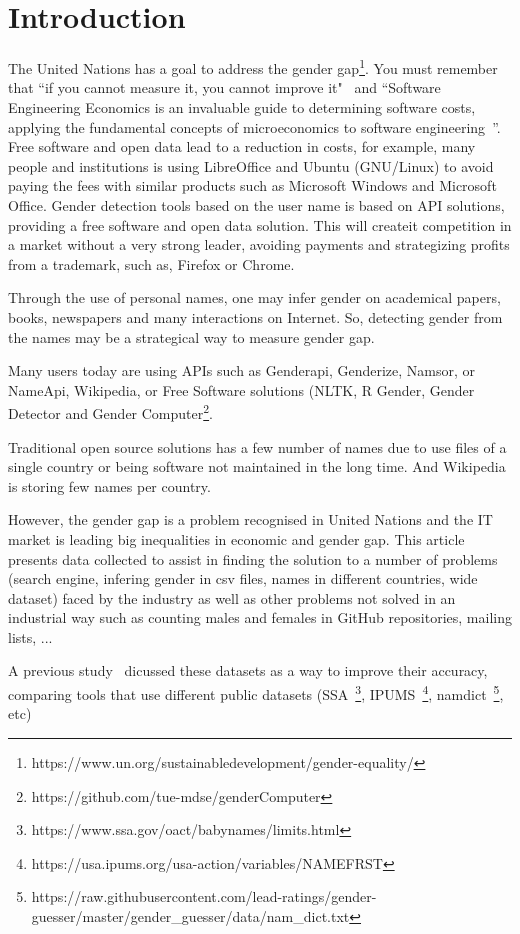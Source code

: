 \documentclass[a4paper]{article}
\begin{document}
\section{Introduction}
The United Nations has a goal to address the gender
gap\footnote{https://www.un.org/sustainabledevelopment/gender-equality/}.
You must remember that ``if you cannot measure it, you cannot
improve it"~\cite{thompson1833electrical} and ``Software
Engineering Economics is an invaluable guide to determining
software costs, applying the fundamental concepts of microeconomics
to software engineering~\cite{barry1981software}''. Free software and open
data lead to a reduction in costs, for example, many people and
institutions is using LibreOffice and Ubuntu (GNU/Linux) to avoid paying
the fees with similar products such as Microsoft Windows and Microsoft
Office. Gender detection tools based on the user name is based on API
solutions, providing a free software and open data solution. This will
createit competition in a market without a very strong leader, avoiding
payments and strategizing profits from a trademark, such as, Firefox or
Chrome.

Through the use of personal names, one may infer gender on
academical papers, books, newspapers and many interactions on Internet.
So, detecting gender from the names may be a strategical way to
measure gender gap.

Many users today are using APIs such as Genderapi, Genderize,
Namsor, or NameApi, Wikipedia, or Free Software solutions
(NLTK\cite{loper2002nltk}, R Gender, Gender Detector and Gender
Computer\footnote{https://github.com/tue-mdse/genderComputer}.

Traditional open source solutions has a few number of names due to
use files of a single country or being software not maintained in
the long time. And Wikipedia is storing few names per country.

However, the gender gap is a problem recognised in United Nations and
the IT market is leading big inequalities in economic and gender gap.
This article presents data collected to assist in finding the solution
to a number of problems (search engine, infering gender in csv files,
names in different countries, wide dataset) faced by
the industry as well as other problems not solved in an industrial way
such as counting males and females in GitHub repositories, mailing lists,
...

A previous study~\cite{karimi2016inferring} dicussed these datasets as
a way to improve their accuracy, comparing tools that use different
public datasets (SSA~\footnote{https://www.ssa.gov/oact/babynames/limits.html},
IPUMS~\footnote{https://usa.ipums.org/usa-action/variables/NAMEFRST},
namdict~\footnote{https://raw.githubusercontent.com/lead-ratings/gender-guesser/master/gender\_guesser/data/nam\_dict.txt}, etc)
\end{document}
